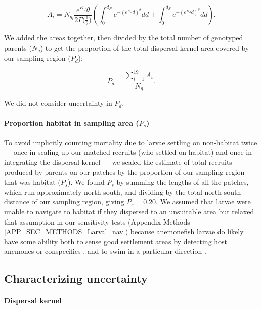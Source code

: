 \documentclass[12pt, oneside]{article}   	%
\begin{document}
\begin{equation} 
A_i = N_{g_i} \frac{e^{K_d}\theta}{2\Gamma({\frac{1}{\theta})}} \left( \int_{0}^{d_N}e^{-(e^{K_d}d)^\theta}  dd + \int_{0}^{d_S}e^{-(e^{K_d}d)^\theta}  dd \right). 
\end{equation}

We added the areas together, then divided by the total number of genotyped parents ($N_g$) to get the proportion of the total dispersal kernel area covered by our sampling region ($P_d$):

\begin{equation}
P_d = \frac{\sum_{i=1}^{19} A_i}{N_g}. \label{EQN_DK_area_within_sampling_region}
\end{equation}

We did not consider uncertainty in $P_d$.

\paragraph*{Proportion habitat in sampling area ($P_s$)} 

To avoid implicitly counting mortality due to larvae settling on non-habitat twice --- once in scaling up our matched recruits (who settled on habitat) and once in integrating the dispersal kernel --- we scaled the estimate of total recruits produced by parents on our patches by the proportion of our sampling region that was habitat ($P_s$). We found $P_s$ by summing the lengths of all the patches, which run approximately north-south, and dividing by the total north-south distance of our sampling region, giving $P_s = 0.20$. We assumed that larvae were unable to navigate to habitat if they dispersed to an unsuitable area but relaxed that assumption in our sensitivity tests (Appendix Methods \ref{APP_SEC_METHODS_Larval_nav}) because anemonefish larvae do likely have some ability both to sense good settlement areas by detecting host anemones \citep{elliott1995host, arvedlund1999host} or conspecifics \citep[e.g.,][for coral reef fish more broadly]{lecchini2005experimental}, and to swim in a particular direction \citep[e.g.,][]{bellwood2001relative, fisher2005swimming}. 

\subsection{Characterizing uncertainty} \label{APP_SEC_Uncertainty}

\paragraph*{Dispersal kernel} 
\end{document}
